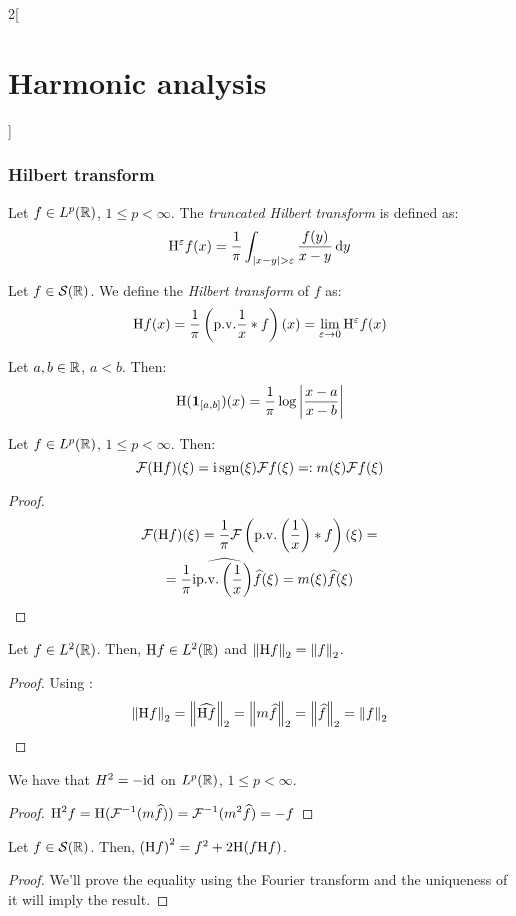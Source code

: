 \documentclass[../../../main_math.tex]{subfiles}
\begin{document}
\begin{multicols}{2}[\section{Harmonic analysis}]
  \subsubsection{Hilbert transform}
  \begin{definition}
    Let $f\in L^p(\mathbb{R})$, $1\leq p<\infty$. The \emph{truncated Hilbert transform} is defined as:
    $$
      \mathrm{H}^\varepsilon f(x)=\frac{1}{\pi}\int_{\abs{x-y}>\varepsilon}\frac{f(y)}{x-y}\dd{y}
    $$
  \end{definition}
  \begin{definition}
    Let $f\in \mathcal{S}(\mathbb{R})$. We define the \emph{Hilbert transform} of $f$ as:
    $$
      \mathrm{H} f(x)=\frac{1}{\pi}\left(\mathrm{p.v.}\frac{1}{x}*f\right)(x)=\lim_{\varepsilon\to 0} \mathrm{H}^\varepsilon f(x)
    $$
  \end{definition}
  \begin{lemma}
    Let $a,b\in\mathbb{R}$, $a<b$. Then:
    $$
      \mathrm{H}(\boldsymbol{\mathrm{1}}_{[a,b]})(x)=\frac{1}{\pi}\log\left| \frac{x-a}{x-b}\right|
    $$
  \end{lemma}
  \begin{proposition}
    Let $f\in L^p(\mathbb{R})$, $1\leq p<\infty$. Then:
    $$
      \mathcal{F}(\mathrm{H} f)(\xi)=\mathrm{i}\operatorname{sgn}(\xi)\mathcal{F} f(\xi)=:m(\xi)\mathcal{F} f(\xi)
    $$
  \end{proposition}
  \begin{proof}
    \begin{multline*}
      \mathcal{F}(\mathrm{H} f)(\xi)=\frac{1}{\pi}\mathcal{F}\left(\mathrm{p.v.}\left(\frac{1}{x}\right)*f\right)(\xi)=\\
      =\frac{1}{\pi}\mathrm{i} \widehat{\mathrm{p.v.}\left(\frac{1}{x}\right)}\widehat{f}(\xi)=m(\xi)\widehat{f}(\xi)
    \end{multline*}
  \end{proof}
  \begin{lemma}
    Let $f\in L^2(\mathbb{R})$. Then, $\mathrm{H} f\in L^2(\mathbb{R})$ and $\left\|\mathrm{H} f\right\|_{2}= \left\|f\right\|_{2}$.
  \end{lemma}
  \begin{proof}
    Using :
    $$
      \left\|\mathrm{H} f\right\|_{2} = \left\|\widehat{\mathrm{H} f}\right\|_{2}=\left\|m\widehat{f}\right\|_{2}=\left\|\widehat{f}\right\|_{2}=\left\|f\right\|_{2}
    $$
  \end{proof}
  \begin{lemma}
    We have that $H^2=-\mathrm{id}$ on $L^p(\mathbb{R})$, $1\leq p<\infty$.
  \end{lemma}
  \begin{proof}
    $\displaystyle
      \mathrm{H}^2 f=\mathrm{H}(\mathcal{F}^{-1}(m\widehat{f}))=\mathcal{F}^{-1}(m^2\widehat{f})=-f
    $
  \end{proof}
  \begin{lemma}\label{HA:prethmSingInt}
    Let $f\in \mathcal{S}(\mathbb{R})$. Then, ${(\mathrm{H} f)}^2=f^2+2\mathrm{H}(f\mathrm{H} f)$.
  \end{lemma}
  \begin{proof}
    We'll prove the equality using the Fourier transform and the uniqueness of it will imply the result.


\end{proof}
\end{multicols}
\end{document}
